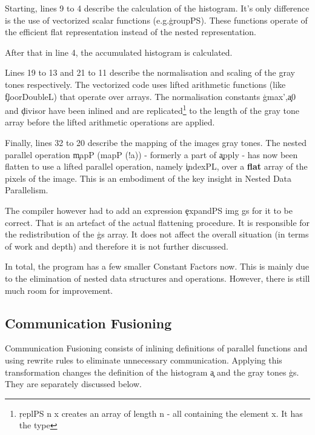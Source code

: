     Starting, lines 9 to 4 describe the calculation of the histogram.
    It's only difference is the use of vectorized scalar functions (e.g.\c{groupPS}). These functions operate of the efficient flat
    representation instead of the nested representation.
    
    After that in line 4, the accumulated histogram is calculated.
    
    Lines 19 to 13 and 21 to 11 describe the normalisation and scaling of the gray tones respectively.
    The vectorized code uses lifted arithmetic functions (like \c{floorDoubleL}) that
    operate over arrays.
    The normalisation constants \c{gmax'},\c{a0} and \c{divisor}
    have been inlined and are replicated\footnote{\c{replPS n x} creates an array of length n - all containing the element x. It has the type }
    to the length of the gray tone array before the lifted arithmetic operations are applied.
    
    
    Finally, lines 32 to 20 describe the mapping of the images gray tones.
    The nested parallel operation \c{mapP (mapP (!a))} - formerly a part of \c{apply} - 
    has now been flatten to use a lifted parallel operation, namely \c{indexPL}, over a \textbf{flat} array of
    the pixels of the image. This is an embodiment of the key insight in Nested Data Parallelism.
    
    The compiler however had to add an expression \c{expandPS img gs} for it to be
    correct. That is an artefact of the actual flattening procedure.
    It is responsible for the redistribution of the \c{gs} array. It does not affect the
    overall situation (in terms of work and depth) and therefore
    it is not further discussed.
    
    In total, the program has a few smaller Constant Factors now. This is mainly due to the elimination of nested data structures
    and operations. However, there is still much room for improvement.
    
  \subsection{Communication Fusioning}
    
    Communication Fusioning consists of inlining definitions of parallel functions and using rewrite rules to eliminate
    unnecessary communication. Applying this transformation changes the definition of the histogram \c{a} and the
    gray tones \c{gs}. They are separately discussed below.
    
